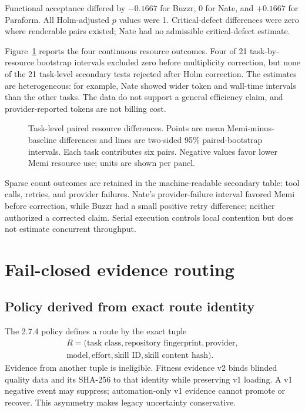\documentclass[9pt,twocolumn]{extarticle}
\begin{document}
Functional acceptance differed by $-0.1667$ for Buzzr, $0$ for Nate, and
$+0.1667$ for Paraform. All Holm-adjusted $p$ values were 1. Critical-defect
differences were zero where renderable pairs existed; Nate had no admissible
critical-defect estimate.

Figure~\ref{fig:resources} reports the four continuous resource outcomes. Four
of 21 task-by-resource bootstrap intervals excluded zero before multiplicity
correction, but none of the 21 task-level secondary tests rejected after Holm
correction. The estimates are heterogeneous: for example, Nate showed wider
token and wall-time intervals than the other tasks. The data do not support a
general efficiency claim, and provider-reported tokens are not billing cost.

\begin{figure}[t]
\centering
\ResourceFigure
\caption{Task-level paired resource differences. Points are mean Memi-minus-
baseline differences and lines are two-sided 95\% paired-bootstrap intervals.
Each task contributes six pairs. Negative values favor lower Memi resource use;
units are shown per panel.}
\label{fig:resources}
\end{figure}

Sparse count outcomes are retained in the machine-readable secondary table:
tool calls, retries, and provider failures. Nate's provider-failure interval
favored Memi before correction, while Buzzr had a small positive retry
difference; neither authorized a corrected claim. Serial execution controls
local contention but does not estimate concurrent throughput.

\section{Fail-closed evidence routing}

\subsection{Policy derived from exact route identity}

The 2.7.4 policy defines a route by the exact tuple
\begin{multline}
R=(\text{task class},\text{repository fingerprint},\text{provider},\\
\text{model},\text{effort},\text{skill ID},\text{skill content hash}).
\end{multline}
Evidence from another tuple is ineligible. Fitness evidence v2 binds blinded
quality data and its SHA-256 to that identity while preserving v1 loading. A v1
negative event may suppress; automation-only v1 evidence cannot promote or
recover. This asymmetry makes legacy uncertainty conservative.
\end{document}
